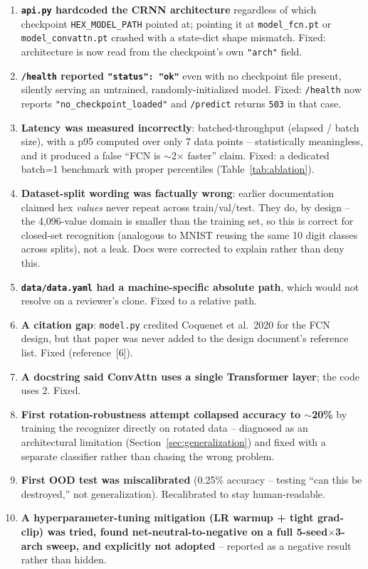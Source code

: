 \documentclass[11pt]{article}
\begin{document}
\begin{enumerate}
    \item \textbf{\texttt{api.py} hardcoded the CRNN architecture} regardless of which
    checkpoint \texttt{HEX\_MODEL\_PATH} pointed at; pointing it at
    \texttt{model\_fcn.pt} or \texttt{model\_convattn.pt} crashed with a state-dict
    shape mismatch. Fixed: architecture is now read from the checkpoint's own
    \texttt{"arch"} field.
    \item \textbf{\texttt{/health} reported \texttt{"status": "ok"}} even with no
    checkpoint file present, silently serving an untrained, randomly-initialized model.
    Fixed: \texttt{/health} now reports \texttt{"no\_checkpoint\_loaded"} and
    \texttt{/predict} returns \texttt{503} in that case.
    \item \textbf{Latency was measured incorrectly}: batched-throughput
    (elapsed / batch size), with a p95 computed over only 7 data points -- statistically
    meaningless, and it produced a false ``FCN is $\sim$2$\times$ faster'' claim. Fixed:
    a dedicated batch=1 benchmark with proper percentiles (Table~\ref{tab:ablation}).
    \item \textbf{Dataset-split wording was factually wrong}: earlier documentation
    claimed hex \emph{values} never repeat across train/val/test. They do, by design --
    the 4,096-value domain is smaller than the training set, so this is correct for
    closed-set recognition (analogous to MNIST reusing the same 10 digit classes across
    splits), not a leak. Docs were corrected to explain rather than deny this.
    \item \textbf{\texttt{data/data.yaml} had a machine-specific absolute path}, which
    would not resolve on a reviewer's clone. Fixed to a relative path.
    \item \textbf{A citation gap}: \texttt{model.py} credited Coquenet et al.\ 2020 for
    the FCN design, but that paper was never added to the design document's reference
    list. Fixed (reference~[6]).
    \item \textbf{A docstring said ConvAttn uses a single Transformer layer}; the code
    uses 2. Fixed.
    \item \textbf{First rotation-robustness attempt collapsed accuracy to $\sim$20\%}
    by training the recognizer directly on rotated data -- diagnosed as an
    architectural limitation (Section~\ref{sec:generalization}) and fixed with a
    separate classifier rather than chasing the wrong problem.
    \item \textbf{First OOD test was miscalibrated} (0.25\% accuracy -- testing ``can
    this be destroyed,'' not generalization). Recalibrated to stay human-readable.
    \item \textbf{A hyperparameter-tuning mitigation (LR warmup + tight grad-clip) was
    tried, found net-neutral-to-negative on a full 5-seed$\times$3-arch sweep, and
    explicitly not adopted} -- reported as a negative result rather than hidden.
\end{enumerate}
\end{document}
